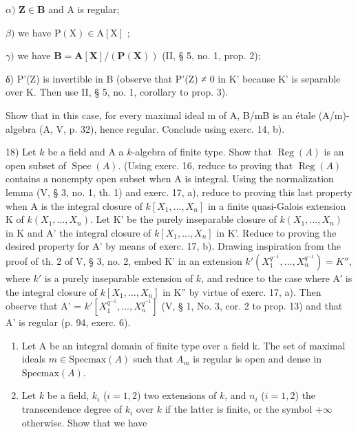 \(\alpha)\) \(\mathbf{Z}\in \mathbf{B}\) and A is regular;

\(\beta)\) we have \(\mathrm{P}(\mathrm{X})\in \mathrm{A}[\mathrm{X}]\) ;

\(\gamma)\) we have \(\mathbf{B} = \mathbf{A}[\mathbf{X}] / (\mathbf{P}(\mathbf{X}))\) (II, § 5, no. 1, prop. 2);

δ) P'(Z) is invertible in B (observe that P'(Z) ≠ 0 in K' because K' is separable over K. Then use II, § 5, no. 1, corollary to prop. 3).

Show that in this case, for every maximal ideal m of A, B/mB is an étale (A/m)-algebra (A, V, p. 32), hence regular. Conclude using exerc. 14, b).

18) Let \(k\) be a field and A a \(k\)-algebra of finite type. Show that \(\operatorname{Reg}(A)\) is an open subset of \(\operatorname{Spec}(A)\). (Using exerc. 16, reduce to proving that \(\operatorname{Reg}(A)\) contains a nonempty open subset when A is integral. Using the normalization lemma (V, § 3, no. 1, th. 1) and exerc. 17, a), reduce to proving this last property when A is the integral closure of \(k[X_1, ..., X_n]\) in a finite quasi-Galois extension K of \(k(X_1, ..., X_n)\). Let K' be the purely inseparable closure of \(k(X_1, ..., X_n)\) in K and A' the integral closure of \(k[X_1, ..., X_n]\) in K'. Reduce to proving the desired property for A' by means of exerc. 17, b). Drawing inspiration from the proof of th. 2 of V, § 3, no. 2, embed K' in an extension \(k'(X_1^{q^{-1}}, ..., X_n^{q^{-1}}) = K''\), where \(k'\) is a purely inseparable extension of \(k\), and reduce to the case where A′ is the integral closure of \(k[X_1, ..., X_n]\) in K'' by virtue of exerc. 17, a). Then observe that A' = \(k'[X_1^{q^{-1}}, ..., X_n^{q^{-1}}]\) (V, § 1, No. 3, cor. 2 to prop. 13) and that A' is regular (p. 94, exerc. 6).

\begin{enumerate}
\def\labelenumi{\arabic{enumi})}
\setcounter{enumi}{18}
\item
  Let A be an integral domain of finite type over a field k. The set of maximal ideals \(m \in \text{Specmax}(A)\) such that \(A_{m}\) is regular is open and dense in \(\text{Specmax}(A)\).
\item
  Let \(k\) be a field, \(k_{i}\) (\(i = 1, 2\)) two extensions of \(k\), and \(n_{i}\) (\(i = 1, 2\)) the transcendence degree of \(k_{i}\) over \(k\) if the latter is finite, or the symbol +\(\infty\) otherwise. Show that we have
\end{enumerate}

